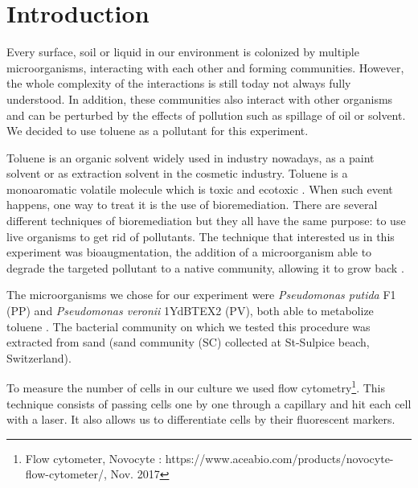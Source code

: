 \documentclass[a4paper, 10pt, conference]{ieeeconf}   %
\begin{document}
\section{Introduction}


Every surface, soil or liquid in our environment is colonized by multiple microorganisms, interacting with each other and forming communities. However, the whole complexity of the interactions is still today not always fully understood.
In addition, these communities also interact with other organisms and can be perturbed by the effects of pollution such as spillage of oil or solvent. We decided to use toluene as a pollutant for this experiment.

Toluene is an organic solvent widely used in industry nowadays, as a paint solvent or as extraction solvent in the cosmetic industry. Toluene is a monoaromatic volatile molecule which is toxic and ecotoxic \cite{toluene}. 
When such event happens, one way to treat it is the use of bioremediation. There are several different techniques of bioremediation but they all have the same purpose: to use live organisms to get rid of pollutants. The technique that interested us in this experiment was bioaugmentation, the addition of a microorganism able to degrade the targeted pollutant to a native community, allowing it to grow back \cite{Bioremediation}.

The microorganisms we chose for our experiment were \textit{Pseudomonas putida} F1 (PP) and \textit{Pseudomonas veronii} 1YdBTEX2 (PV), both able to metabolize toluene \cite{pseudomonas_putida} \cite{Pseudomonas_Veronii}. The bacterial community on which we tested this procedure was extracted from sand (sand community (SC) collected at St-Sulpice beach, Switzerland).

To measure the number of cells in our culture we used flow cytometry\footnote{Flow cytometer, Novocyte : https://www.aceabio.com/products/nov\linebreak[0]ocyte-flow-cytometer/, Nov. 2017}. This technique consists of passing cells one by one through a capillary and hit each cell with a laser. It also allows us to differentiate cells by their fluorescent markers.
\end{document}
